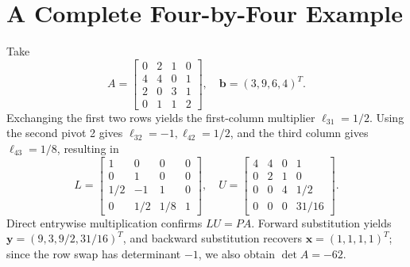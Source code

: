\section{A Complete Four-by-Four Example}
Take
\[
 A=\begin{bmatrix}0&2&1&0\\4&4&0&1\\2&0&3&1\\0&1&1&2\end{bmatrix},
 \quad \bm b=(3,9,6,4)^T.
\]
Exchanging the first two rows yields the first-column multiplier $\ell_{31}=1/2$. Using the second pivot 2 gives $\ell_{32}=-1,\ell_{42}=1/2$, and the third column gives $\ell_{43}=1/8$, resulting in
\[
 L=\begin{bmatrix}1&0&0&0\\0&1&0&0\\1/2&-1&1&0\\0&1/2&1/8&1\end{bmatrix},
 \quad U=\begin{bmatrix}4&4&0&1\\0&2&1&0\\0&0&4&1/2\\0&0&0&31/16\end{bmatrix}.
\]
Direct entrywise multiplication confirms $LU=PA$. Forward substitution yields $\bm y=(9,3,9/2,31/16)^T$, and backward substitution recovers $\bm x=(1,1,1,1)^T$; since the row swap has determinant $-1$, we also obtain $\det A=-62$.

